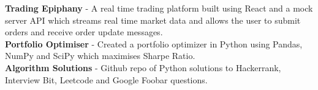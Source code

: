 
\begin{cvparagraph}

\textbf{Trading Epiphany}
- A real time trading platform built using React and a mock server API
which streams real time market data and allows the user to submit orders and
receive order update messages.\\
\textbf{Portfolio Optimiser}
- Created a portfolio optimizer in Python using Pandas, NumPy and SciPy which maximises Sharpe Ratio.\\
\textbf{Algorithm Solutions}
- Github repo of Python solutions to Hackerrank, Interview Bit, Leetcode and Google Foobar questions.
\end{cvparagraph}
